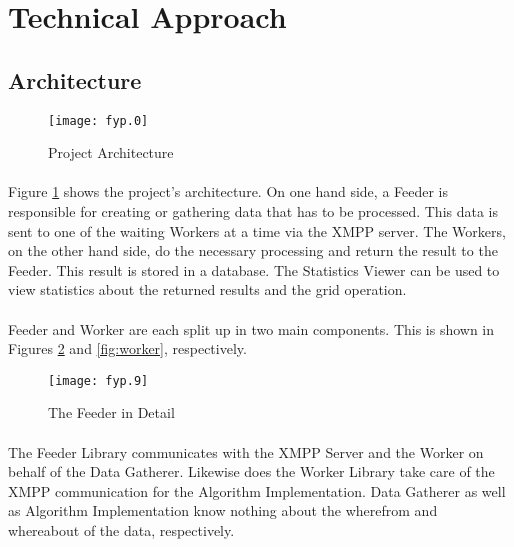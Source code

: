 \section{Technical Approach}

\subsection{Architecture}

\begin{figure}[H]
\begin{center}
\texttt{[image: fyp.0]}
\end{center}
\caption{Project Architecture}
\label{fig:architecture}
\end{figure}

\paragraph{}
Figure \ref{fig:architecture} shows the project's architecture. On one hand side, a Feeder is responsible for creating or gathering data that has to be processed. This data is sent to one of the waiting Workers at a time via the XMPP server. The Workers, on the other hand side, do the necessary processing and return the result to the Feeder. This result is stored in a database. The Statistics Viewer can be used to view statistics about the returned results and the grid operation.

\paragraph{}
Feeder and Worker are each split up in two main components. This is shown in Figures \ref{fig:feeder} and \ref{fig:worker}, respectively.

\begin{figure}[H]
\begin{center}
\texttt{[image: fyp.9]}
\end{center}
\caption{The Feeder in Detail}
\label{fig:feeder}
\end{figure}

\paragraph{}
The Feeder Library communicates with the XMPP Server and the Worker on behalf of the Data Gatherer. Likewise does the Worker Library take care of the XMPP communication for the Algorithm Implementation. Data Gatherer as well as Algorithm Implementation know nothing about the wherefrom and whereabout of the data, respectively.

